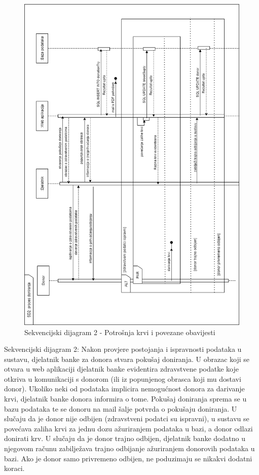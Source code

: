				\begin{figure}[H]
    			\includegraphics[scale=0.7]{slike/SD2_rot.png} %
    			\centering
    			\caption{Sekvencijski dijagram 2 - Potrošnja krvi i povezane obavijesti}
    			\label{fig:promjene}
    	    	\end{figure}
				
				\eject
				
				\par {
    	    	   Sekvencijski dijagram 2: Nakon provjere postojanja i ispravnosti podataka u sustavu, djelatnik banke za
donora stvara pokušaj doniranja. U obrazac koji se otvara u web aplikaciji
djelatnik banke evidentira zdravstvene podatke koje otkriva u komunikaciji s 
donorom (ili iz popunjenog obrasca koji mu dostavi donor).
Ukoliko neki od podataka implicira nemogućnost donora za darivanje krvi,
djelatnik banke donora informira o tome. Pokušaj doniranja sprema se u bazu podataka
te se donoru na mail šalje potvrda o pokušaju doniranja.
U slučaju da je donor nije odbijen (zdravstveni podatci su ispravni), u
sustavu se povećava zaliha krvi za jednu dozu ažuriranjem podataka u bazi, a
donor odlazi donirati krv.
U slučaju da je donor trajno odbijen, djelatnik banke dodatno u njegovom računu zabilježava
trajno odbijanje ažuriranjem donorovih podataka u bazi.
Ako je donor samo privremeno odbijen, ne poduzimaju se nikakvi dodatni koraci.
    	    	}
				
